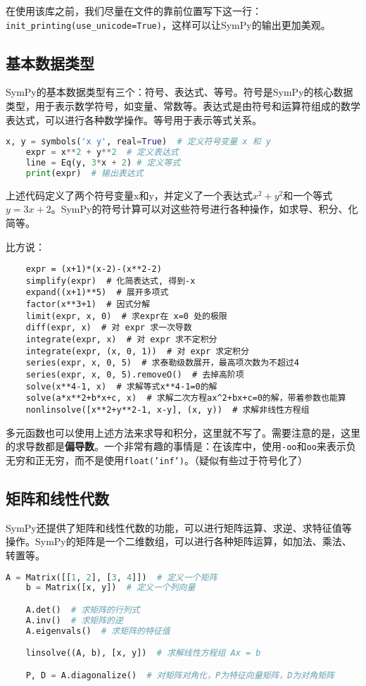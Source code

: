 \documentclass[../main.tex]{subfiles}
\begin{document}
在使用该库之前，我们尽量在文件的靠前位置写下这一行：\texttt{init\_printing(use\_unicode=True)}，这样可以让SymPy的输出更加美观。

\subsection{基本数据类型}
SymPy的基本数据类型有三个：符号、表达式、等号。符号是SymPy的核心数据类型，用于表示数学符号，如变量、常数等。表达式是由符号和运算符组成的数学表达式，可以进行各种数学操作。等号用于表示等式关系。
\begin{lstlisting}[language=python]
    x, y = symbols('x y', real=True)  # 定义符号变量 x 和 y
    expr = x**2 + y**2  # 定义表达式
    line = Eq(y, 3*x + 2) # 定义等式
    print(expr)  # 输出表达式
\end{lstlisting}
上述代码定义了两个符号变量x和y，并定义了一个表达式$x^2 + y^2$和一个等式$y = 3x + 2$。SymPy的符号计算可以对这些符号进行各种操作，如求导、积分、化简等。

比方说：
\begin{lstlisting}
    expr = (x+1)*(x-2)-(x**2-2)
    simplify(expr)  # 化简表达式, 得到-x
    expand((x+1)**5)  # 展开多项式
    factor(x**3+1)  # 因式分解
    limit(expr, x, 0)  # 求expr在 x=0 处的极限
    diff(expr, x)  # 对 expr 求一次导数
    integrate(expr, x)  # 对 expr 求不定积分
    integrate(expr, (x, 0, 1))  # 对 expr 求定积分
    series(expr, x, 0, 5)  # 求泰勒级数展开，最高项次数为不超过4
    series(expr, x, 0, 5).removeO()  # 去掉高阶项
    solve(x**4-1, x)  # 求解等式x**4-1=0的解
    solve(a*x**2+b*x+c, x)  # 求解二次方程ax^2+bx+c=0的解，带着参数也能算
    nonlinsolve([x**2+y**2-1, x-y], (x, y))  # 求解非线性方程组
\end{lstlisting}

多元函数也可以使用上述方法来求导和积分，这里就不写了。需要注意的是，这里的求导数都是\textbf{偏导数}。一个非常有趣的事情是：在该库中，使用\texttt{-oo}和\texttt{oo}来表示负无穷和正无穷，而不是使用\texttt{float('inf')}。（疑似有些过于符号化了）

\subsection{矩阵和线性代数}
SymPy还提供了矩阵和线性代数的功能，可以进行矩阵运算、求逆、求特征值等操作。SymPy的矩阵是一个二维数组，可以进行各种矩阵运算，如加法、乘法、转置等。
\begin{lstlisting}[language=python]
    A = Matrix([[1, 2], [3, 4]])  # 定义一个矩阵
    b = Matrix([x, y])  # 定义一个列向量

    A.det()  # 求矩阵的行列式
    A.inv()  # 求矩阵的逆
    A.eigenvals()  # 求矩阵的特征值

    linsolve((A, b), [x, y])  # 求解线性方程组 Ax = b

    P, D = A.diagonalize()  # 对矩阵对角化，P为特征向量矩阵，D为对角矩阵
\end{lstlisting}
\end{document}
